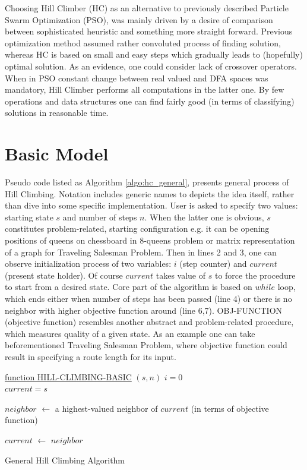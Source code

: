 \documentclass{mini}
\begin{document}
Choosing Hill Climber (HC) as an alternative to previously described Particle Swarm Optimization (PSO), was mainly driven by a desire of comparison between sophisticated heuristic and something more straight forward. Previous optimization method assumed rather convoluted process of finding solution, whereas HC is based on small and easy steps which gradually leads to (hopefully) optimal solution. As an evidence, one could consider lack of crossover operators. When in PSO constant change between real valued and DFA spaces was mandatory, Hill Climber performs all computations in the latter one. By few operations and data structures one can find fairly good (in terms of classifying) solutions in reasonable time. 

\section{Basic Model}
Pseudo code listed as Algorithm \ref{algo:hc_general}, presents general process of Hill Climbing. Notation includes generic names to depicts the idea itself, rather than dive into some specific implementation. User is asked to specify two values: starting state $s$ and number of steps $n$. When the latter one is obvious, $s$ constitutes problem-related, starting configuration e.g. it can be opening positions of queens on chessboard in 8-queens problem or matrix representation of a graph for Traveling Salesman Problem. Then in lines 2 and 3, one can observe initialization process of two variables: $i$ (step counter) and $current$ (present state holder). Of course $current$ takes value of $s$ to force the procedure to start from a desired state. Core part of the algorithm is based on $while$ loop, which ends either when number of steps has been passed (line 4) or there is no neighbor with higher objective function around (line 6,7). \textsc{OBJ-FUNCTION} (objective function) resembles another abstract and problem-related procedure, which measures quality of a given state. As an example one can take beforementioned Traveling Salesman Problem, where objective function could result in specifying a route length for its input. 

\begin{algorithm}[H]
    \underline{function HILL-CLIMBING-BASIC} $(s, n)$\;
    $i = 0$ \\
    $current = s$ \\
    {
        $neighbor$ $\gets$ a highest-valued neighbor of $current$ (in terms of objective function) \\
        
        {
        }
        
        $current$ $\gets$ $neighbor$
    }
    \caption{General Hill Climbing Algorithm}
    \label{algo:hc_general}
\end{algorithm}
\end{document}
